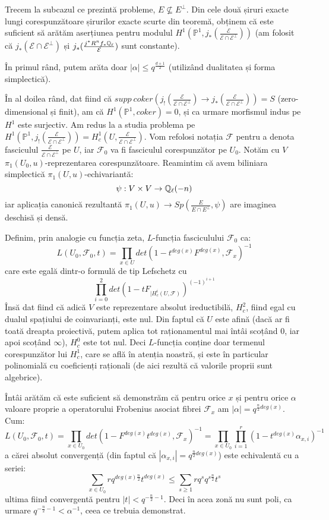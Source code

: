 \documentclass[13pt,openany,oneside]{book}
\begin{document}
Trecem la subcazul ce prezintă probleme, $E \nsubseteq E^\perp$. Din cele două șiruri exacte lungi corespunzătoare șirurilor exacte scurte din teoremă, obținem că este suficient să arătăm aserțiunea pentru modulul $H^1(\mathbb{P}^1,j_*(\frac{\mathcal{E}}{\mathcal{E} \cap \mathcal{E}^\perp}))$ (am folosit că $j_*(\mathcal{E} \cap \mathcal{E}^\perp)$ și $j_*(\frac{j^* R^n f_* \mathbb{Q}_\ell}{\mathcal{E}})$ sunt constante).

În primul rând, putem arăta doar $|\alpha|\leq q^{\frac{d+1}{2}}$ (utilizând dualitatea și forma simplectică).

În al doilea rând, dat fiind că $supp\ coker(j_!(\frac{\mathcal{E}}{\mathcal{E} \cap \mathcal{E}^\perp}) \rightarrow j_*(\frac{\mathcal{E}}{\mathcal{E} \cap \mathcal{E}^\perp})) = S$ (zero-dimensional și finit), am că $H^1(\mathbb{P}^1,coker)=0$, și ca urmare morfismul indus pe $H^1$ este surjectiv. Am redus la a studia problema pe $H^1(\mathbb{P}^1,j_!(\frac{\mathcal{E}}{\mathcal{E} \cap \mathcal{E}^\perp})) = H^1_c (U, \frac{\mathcal{E}}{\mathcal{E} \cap \mathcal{E}^\perp})$. Vom refolosi notația $\mathcal{F}$ pentru a denota fasciculul $\frac{\mathcal{E}}{\mathcal{E} \cap \mathcal{E}^\perp}$ pe $U$, iar $\mathcal{F}_0$ va fi fasciculul corespunzător pe $U_0$. Notăm cu $V$ $\pi_1(U_0,u)$-reprezentarea corespunzătoare. Reamintim că avem biliniara simplectică $\pi_1(U,u)$-echivariantă:
$$\psi : V \times V \rightarrow \mathbb{Q}_\ell(-n)$$
iar aplicația canonică rezultantă $\pi_1(U,u) \rightarrow Sp(\frac{E}{E \cap E^\perp},\psi)$ are imaginea deschisă și densă.

Definim, prin analogie cu funcția zeta, $L$-funcția fasciculului $\mathcal{F}_0$ ca:
$$L(U_0,\mathcal{F}_0,t)=\prod\limits_{x \in U} det(1-t^{deg(x)}F^{deg(x)}, \mathcal{F}_x)^{-1}$$
care este egală dintr-o formulă de tip Lefschetz cu
$$\prod\limits_{i=0}^2 det(1-tF_{\mid H^i_c(U,\mathcal{F})})^{(-1)^{i+1}}$$
Însă dat fiind că adică $V$ este reprezentare absolut ireductibilă, $H^2_c$, fiind egal cu dualul spațiului de coinvarianți, este nul. Din faptul că $U$ este afină (dacă ar fi toată dreapta proiectivă, putem aplica tot raționamentul mai întâi scoțând $0$, iar apoi scoțând $\infty$), $H^0_c$ este tot nul. Deci $L$-funcția conține doar termenul corespunzător lui $H^1_c$, care se află în atenția noastră, și este în particular polinomială cu coeficienți raționali (de aici rezultă că valorile proprii sunt algebrice).

Întâi arătăm că este suficient să demonstrăm că pentru orice $x$ și pentru orice $\alpha$ valoare proprie a operatorului Frobenius asociat fibrei $\mathcal{F}_x$ am $|\alpha|=q^{\frac{n}{2} deg(x)}$. Cum:
$$L(U_0,\mathcal{F_0},t)=\prod\limits_{x\in U_0} det(1-F^{deg(x)}t^{deg(x)},\mathcal{F}_x)^{-1} = \prod\limits_{x\in U_0} \prod\limits_{i=1}^r (1-t^{deg(x)}\alpha_{x,i})^{-1}$$
a cărei absolut convergență (din faptul că $|\alpha_{x,i}|=q^{\frac{n}{2} deg(x)}$) este echivalentă cu a seriei:
$$\sum\limits_{x\in U_0} rq^{deg(x)\frac{n}{2}}t^{deg(x)} \leq \sum\limits_{s\geq 1} rq^s q^{s\frac{n}{2}} t^s$$
ultima fiind convergentă pentru $|t|<q^{-\frac{n}{2}-1}$.
Deci în acea zonă nu sunt poli, ca urmare $q^{-\frac{n}{2}-1}<\alpha^{-1}$, ceea ce trebuia demonstrat.
\end{document}
